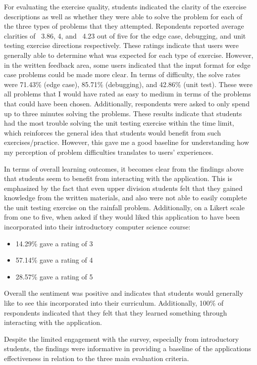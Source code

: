 \documentclass[10pt,twocolumn]{article}
\begin{document}
For evaluating the exercise quality, students indicated the clarity of the exercise descriptions as well as whether they 
were able to solve the problem for
each of the three types of problems that they attempted. Repondents reported average clarities of ~3.86, 4, and ~4.23 out 
of five for the edge case, debugging, and unit testing exercise directions respectively. These ratings indicate that users 
were generally able to determine what was expected for each type of exercise. However, in the written feedback area, some 
users indicated that the input format for edge case problems could be made more clear. In terms of difficulty, the solve 
rates were 71.43\% (edge case), 85.71\% (debugging), and 42.86\% (unit test). These were all problems that I would have 
rated as easy to medium in terms of the problems that could have been chosen. Additionally, respondents were asked to only 
spend up to three minutes solving the problems. These results indicate that students had the most trouble solving the 
unit testing exercise within the time limit, which reinforces the general idea that students would benefit from such 
exercises/practice. However, this gave me a good baseline for understanding how my perception of problem difficulties 
translates to users' experiences.

In terms of overall learning outcomes, it becomes clear from the findings above that students seem to benefit from interacting 
with the application. This is emphasized by the fact that even upper division students felt that they gained knowledge from 
the written materials, and also were not able to easily complete the unit testing exercise on the rainfall problem. Additionally,
on a Likert scale from one to five, when asked if they would liked this application to have been incorporated into their 
introductory computer science course:

\begin{itemize}
    \item 14.29\% gave a rating of 3
    \item 57.14\% gave a rating of 4
    \item 28.57\% gave a rating of 5
\end{itemize}

Overall the sentiment was positive and indicates that students would generally like to see this incorporated into their 
curriculum. Additionally, 100\% of respondents indicated that they felt that they learned something through interacting 
with the application. 

Despite the limited engagement with the survey, especially from introductory students, the findings were informative in 
providing a baseline of the applications effectiveness in relation to the three main evaluation criteria.
\end{document}
